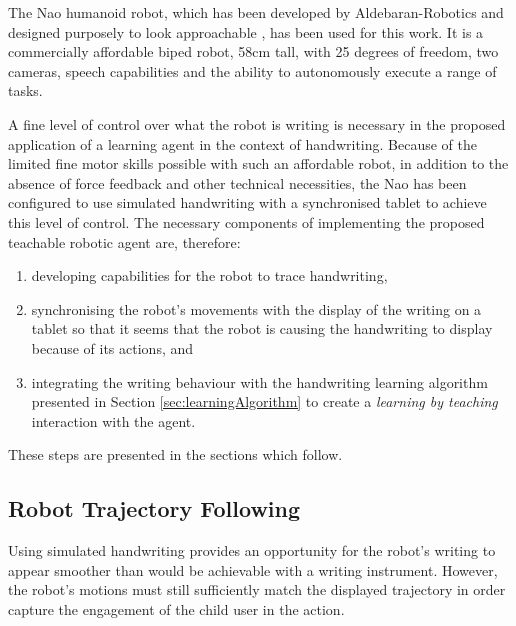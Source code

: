 \documentclass{sig-alternate}
\begin{document}
The Nao humanoid robot, which has been developed by Aldebaran-Robotics and
designed purposely to look approachable \cite{Gouaillier2008}, has been used for
this work. It is a commercially affordable biped robot, 58cm tall, with 25
degrees of freedom, two cameras, speech capabilities and the ability to
autonomously execute a range of tasks.

A fine level of control over what the robot is writing is necessary in the
proposed application of a learning agent in the context of handwriting. Because
of the limited fine motor skills possible with such an affordable robot, in
addition to the absence of force feedback and other technical necessities, the
Nao has been configured to use simulated handwriting with a synchronised tablet
to achieve this level of control. The necessary components of implementing the
proposed teachable robotic agent are, therefore:

\begin{enumerate}
    \item developing capabilities for the robot to trace handwriting, 

    \item synchronising the robot's movements with the display of the writing on a
        tablet so that it seems that the robot is causing the handwriting to
        display because of its actions, and

    \item integrating the writing behaviour with the handwriting learning
        algorithm presented in Section \ref{sec:learningAlgorithm} to create a
        \emph{learning by teaching} interaction with the agent. 
\end{enumerate}

These steps are presented in the sections which follow.

\subsection{Robot Trajectory Following}

Using simulated handwriting provides an opportunity for the robot's writing to
appear smoother than would be achievable with a writing instrument. However, the
robot's motions must still sufficiently match the displayed trajectory in order
capture the engagement of the child user in the action.
\end{document}
